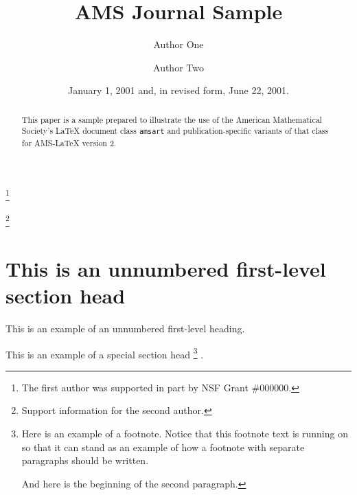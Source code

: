 \documentclass{amsart}
\theoremstyle{definition}
\theoremstyle{remark}
\numberwithin{equation}{section}
\begin{document}
\title{AMS Journal Sample}

\author{Author One}
\address{Department of Mathematics, Louisiana State University, Baton
Rouge, Louisiana 70803}
\thanks{The first author was supported in part by NSF Grant \#000000.}

\author{Author Two}
\address{Mathematical Research Section, School of Mathematical Sciences,
Australian National University, Canberra ACT 2601, Australia}
\thanks{Support information for the second author.}


\date{January 1, 2001 and, in revised form, June 22, 2001.}



\begin{abstract}
This paper is a sample prepared to illustrate the use of the American
Mathematical Society's \LaTeX{} document class \texttt{amsart} and
publication-specific variants of that class for AMS-\LaTeX{} version 2.
\end{abstract}

\maketitle

\section*{This is an unnumbered first-level section head}
This is an example of an unnumbered first-level heading.

This is an example of a special section head%
\footnote{Here is an example of a footnote. Notice that this footnote
text is running on so that it can stand as an example of how a footnote
with separate paragraphs should be written.
\par
And here is the beginning of the second paragraph.}%
.
\end{document}
